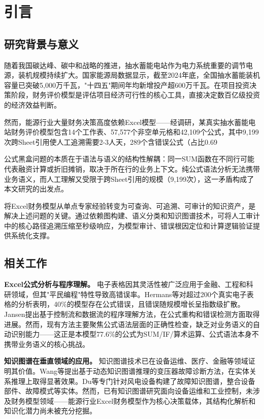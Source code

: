 \section{\heiti 引言}

\subsection{\heiti 研究背景与意义}

随着我国碳达峰、碳中和战略的推进，抽水蓄能电站作为电力系统重要的调节电源，装机规模持续扩大。国家能源局数据显示，截至2024年底，全国抽水蓄能装机容量已突破5,000万千瓦，"十四五"期间年均新增投产超600万千瓦。在项目投资决策阶段，财务评价模型是评估项目经济可行性的核心工具，直接决定数百亿级投资的经济效益判断。

然而，能源行业大量财务决策高度依赖Excel模型——经调研，某真实抽水蓄能电站财务评价模型包含14个工作表、57,577个非空单元格和42,109个公式，其中9,199次跨Sheet引用使人工追溯需要2-3人天，289个含错误公式（占比0.69%

公式黑盒问题的本质在于语法与语义的结构性解耦：同一SUM函数在不同行可能代表融资计算或折旧摊销，取决于所在行的业务上下文。纯公式语法分析无法携带业务语义，而人工理解又受限于跨Sheet引用的规模（9,199次），这一矛盾构成了本文研究的出发点。

将Excel财务模型从单点专家经验转变为可查询、可追溯、可审计的知识资产，是解决上述问题的关键。通过依赖图构建、语义分类和知识图谱技术，可将人工审计中的核心路径追溯压缩至秒级响应，为模型审计、错误根因定位和计算逻辑验证提供系统化支撑。

\subsection{\heiti 相关工作}

\textbf{Excel公式分析与程序理解。} 电子表格因其灵活性被广泛应用于金融、工程和科研领域，但其"平民编程"特性导致高错误率。Hermans等对超过200个真实电子表格的分析表明，40\%的模型存在公式错误，且错误随规模增长呈指数级扩散。Jansen提出基于控制流和数据流的程序理解方法，在公式重构和错误检测方面取得进展。然而，现有方法主要聚焦公式语法层面的正确性检查，缺乏对业务语义的自动识别能力——这正是本模型77.6\%的公式为SUM/IF/算术运算、公式语法本身不携带业务语义的核心挑战。

\textbf{知识图谱在垂直领域的应用。} 知识图谱技术已在设备运维、医疗、金融等领域证明其价值。Wang等提出基于动态知识图谱推理的变压器故障诊断方法，在实体关系推理上取得显著效果。Du等专门针对风电设备构建了故障知识图谱，整合设备部件、故障模式等实体。然而，已有知识图谱研究面向设备运维和工业控制，未涉及财务模型领域——能源行业Excel财务模型作为核心决策载体，其结构化解析和知识化潜力尚未被充分挖掘。

